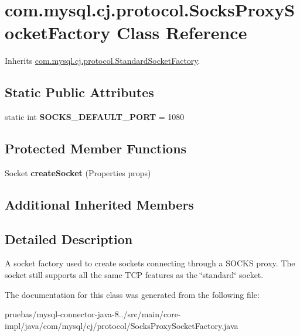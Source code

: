 \hypertarget{classcom_1_1mysql_1_1cj_1_1protocol_1_1_socks_proxy_socket_factory}{}\section{com.\+mysql.\+cj.\+protocol.\+Socks\+Proxy\+Socket\+Factory Class Reference}
\label{classcom_1_1mysql_1_1cj_1_1protocol_1_1_socks_proxy_socket_factory}


Inherits \mbox{\hyperlink{classcom_1_1mysql_1_1cj_1_1protocol_1_1_standard_socket_factory}{com.\+mysql.\+cj.\+protocol.\+Standard\+Socket\+Factory}}.

\subsection*{Static Public Attributes}
\begin{DoxyCompactItemize}
\item 
\mbox{\label{classcom_1_1mysql_1_1cj_1_1protocol_1_1_socks_proxy_socket_factory_af27432a7b73a88cdf4238cfdd9e4eec2}} 
static int {\bfseries S\+O\+C\+K\+S\+\_\+\+D\+E\+F\+A\+U\+L\+T\+\_\+\+P\+O\+RT} = 1080
\end{DoxyCompactItemize}
\subsection*{Protected Member Functions}
\begin{DoxyCompactItemize}
\item 
\mbox{\label{classcom_1_1mysql_1_1cj_1_1protocol_1_1_socks_proxy_socket_factory_af15aaabfd8044241f0baa01d2948adbb}} 
Socket {\bfseries create\+Socket} (Properties props)
\end{DoxyCompactItemize}
\subsection*{Additional Inherited Members}


\subsection{Detailed Description}
A socket factory used to create sockets connecting through a S\+O\+C\+KS proxy. The socket still supports all the same T\+CP features as the \char`\"{}standard\char`\"{} socket. 

The documentation for this class was generated from the following file\+:\begin{DoxyCompactItemize}
\item 
pruebas/mysql-\/connector-\/java-\/8../src/main/core-\/impl/java/com/mysql/cj/protocol/Socks\+Proxy\+Socket\+Factory.\+java\end{DoxyCompactItemize}
